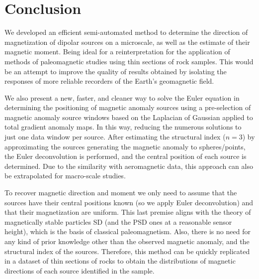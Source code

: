 \section{Conclusion}

We developed an efficient semi-automated method to determine the direction of
magnetization of dipolar sources on a microscale, as well as the estimate of
their magnetic moment. Being ideal for a reinterpretation for the application
of methods of paleomagnetic studies using thin sections of rock samples. This
would be an attempt to improve the quality of results obtained by isolating the
responses of more reliable recorders of the Earth's geomagnetic field.

We also present a new, faster, and cleaner way to solve the Euler equation in
determining the positioning of magnetic anomaly sources using a pre-selection
of magnetic anomaly source windows based on the Laplacian of Gaussian
applied to total gradient anomaly maps. In this way, reducing the numerous
solutions to just one data window per source. After estimating the structural
index ($n = 3$) by approximating the sources generating the magnetic anomaly to
spheres/points, the Euler deconvolution is performed, and the central position
of each source is determined. Due to the similarity with aeromagnetic data, this
approach can also be extrapolated for macro-scale studies.

To recover magnetic direction and moment we only need to assume that the
sources have their central positions known (so we apply Euler deconvolution)
and that their magnetization are uniform. This last premise aligns with the
theory of magnetically stable particles SD (and the PSD ones at a reasonable
sensor height), which is the basis of classical paleomagnetism. Also, there is
no need for any kind of prior knowledge other than the observed magnetic
anomaly, and the structural index of the sources. Therefore, this method can be
quickly replicated in a dataset of thin sections of rocks to obtain the
distributions of magnetic directions of each source identified in the sample.

